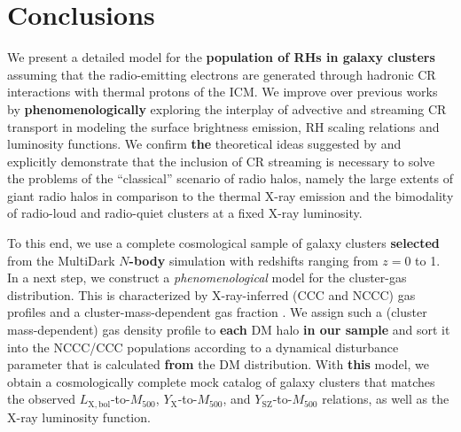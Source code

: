 \documentclass[traditabstract]{aa}
\def\C#1{{\bf #1}}
\newcommand{\rmn}{\mathrm}
\begin{document}


\section{Conclusions}
\label{sec:6}
We present a detailed model for the \C{population of RHs in galaxy clusters} 
assuming that the radio-emitting electrons are generated through hadronic CR 
interactions with thermal protons of the ICM. We improve over previous works by
\C{phenomenologically} exploring the interplay of advective and streaming CR
transport in modeling the surface brightness emission, RH scaling relations and
luminosity functions. We confirm \C{the} theoretical ideas suggested by
\cite{2011A&A...527A..99E} and explicitly demonstrate that the inclusion of CR
streaming is necessary to solve the problems of the ``classical'' scenario of
radio halos, namely the large extents of giant radio halos in comparison to the
thermal X-ray emission and the bimodality of radio-loud and radio-quiet clusters
at a fixed X-ray luminosity.

To this end, we use a complete cosmological sample of galaxy clusters \C{selected}
from the MultiDark \C{$N$-body} simulation \citep{2011arXiv1104.5130P} with redshifts 
ranging from $z = 0$ to 1. In a next step, we construct a \emph{phenomenological} model
for the cluster-gas distribution. This is characterized by X-ray-inferred (CCC
and NCCC) gas profiles \citep[\C{taken from} the REXCESS sample,][]{2008A&A...487..431C} 
and a cluster-mass-dependent gas fraction \citep{2009ApJ...693.1142S}. 
We assign such a (cluster mass-dependent) gas density profile to \C{each} DM 
halo \C{in our sample} and sort it into the NCCC/CCC populations according to a
dynamical disturbance parameter that is calculated \C{from} the DM distribution.
With \C{this} model, we obtain a cosmologically complete mock catalog of galaxy
clusters that matches the observed $L_{\rmn{X, bol}}$-to-$M_{500}$,
$Y_{\rmn{X}}$-to-$M_{500}$, and $Y_{\rmn{SZ}}$-to-$M_{500}$ relations, as well
as the X-ray luminosity function.
\end{document}
